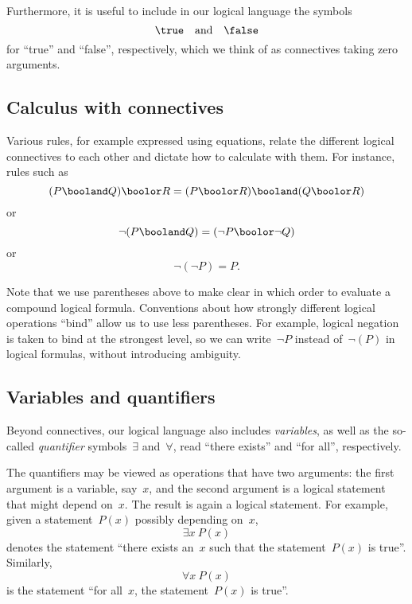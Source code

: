 Furthermore, it is useful to include in our logical language the symbols
\begin{equation}
    \true \quad \text{and} \quad \false
\end{equation}
for ``true'' and ``false'', respectively, which we think of as connectives taking zero arguments.

\subsection{Calculus with connectives}

Various rules, for example expressed using equations, relate the different logical connectives to each other and dictate how to calculate with them.
For instance, rules such as
\begin{equation}
    (P \booland Q) \boolor R
    =
    (P \boolor R) \booland (Q \boolor R)
\end{equation}
or
\begin{equation}
    \lnot (P \booland Q) = (\lnot P \boolor \lnot Q)
\end{equation}
or
\begin{equation}
    \lnot (\lnot P) = P.
\end{equation}

Note that we use parentheses above to make clear in which order to evaluate a compound logical formula.
Conventions about how strongly different logical operations ``bind'' allow us to use less parentheses.
For example, logical negation is taken to bind at the strongest level, so we can write~$\lnot P$ instead of~$\lnot (P)$ in logical formulas, without introducing ambiguity.

\subsection{Variables and quantifiers}

Beyond connectives, our logical language also includes \emph{variables}, as well as the so-called \emph{quantifier} symbols~$\exists$ and~$\forall$, read ``there exists'' and ``for all'', respectively.

The quantifiers may be viewed as operations that have two arguments:
the first argument is a variable, say~$x$, and the second argument is a logical statement that might depend on~$x$.
The result is again a logical statement.
For example, given a statement~$P(x)$ possibly depending on~$x$,
\begin{equation}
    \exists x \ P(x)
\end{equation}
denotes the statement ``there exists an~$x$ such that the statement~$P(x)$ is true''.
Similarly,
\begin{equation}
    \forall x \ P(x)
\end{equation}
is the statement ``for all~$x$, the statement~$P(x)$ is true''.

